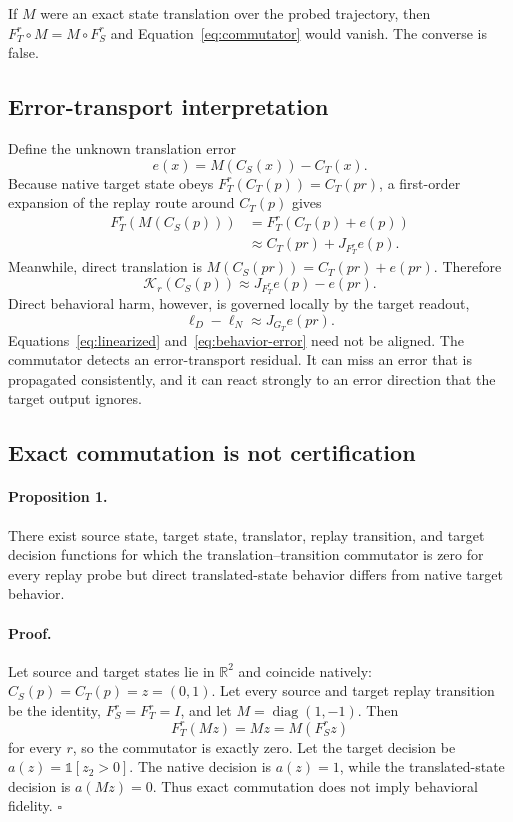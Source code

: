 \documentclass[10pt,twocolumn]{article}
\begin{document}
If $M$ were an exact state translation over the probed trajectory, then
$F_T^r\circ M=M\circ F_S^r$ and Equation~\ref{eq:commutator} would vanish.
The converse is false.

\subsection{Error-transport interpretation}

Define the unknown translation error
\begin{equation}
  e(x)=M(C_S(x))-C_T(x).
\end{equation}
Because native target state obeys $F_T^r(C_T(p))=C_T(pr)$, a first-order
expansion of the replay route around $C_T(p)$ gives
\begin{align}
F_T^r(M(C_S(p)))
  &= F_T^r(C_T(p)+e(p)) \\
  &\approx C_T(pr)+J_{F_T^r}e(p).
\end{align}
Meanwhile, direct translation is $M(C_S(pr))=C_T(pr)+e(pr)$.  Therefore
\begin{equation}
  \mathcal{K}_r(C_S(p))
  \approx J_{F_T^r}e(p)-e(pr).
  \label{eq:linearized}
\end{equation}
Direct behavioral harm, however, is governed locally by the target readout,
\begin{equation}
  \ell_D-\ell_N \approx J_{G_T}e(pr).
  \label{eq:behavior-error}
\end{equation}
Equations~\ref{eq:linearized} and~\ref{eq:behavior-error} need not be aligned.
The commutator detects an error-transport residual.  It can miss an error that
is propagated consistently, and it can react strongly to an error direction
that the target output ignores.

\subsection{Exact commutation is not certification}

\paragraph{Proposition 1.}
There exist source state, target state, translator, replay transition, and
target decision functions for which the translation--transition commutator is
zero for every replay probe but direct translated-state behavior differs from
native target behavior.

\paragraph{Proof.}
Let source and target states lie in $\mathbb{R}^2$ and coincide natively:
$C_S(p)=C_T(p)=z=(0,1)$.  Let every source and target replay transition be the
identity, $F_S^r=F_T^r=I$, and let
$M=\operatorname{diag}(1,-1)$.  Then
\[
  F_T^r(Mz)=Mz=M(F_S^r z)
\]
for every $r$, so the commutator is exactly zero.  Let the target decision be
$a(z)=\mathbb{1}[z_2>0]$.  The native decision is $a(z)=1$, while the
translated-state decision is $a(Mz)=0$.  Thus exact commutation does not imply
behavioral fidelity. \hfill$\square$
\end{document}

